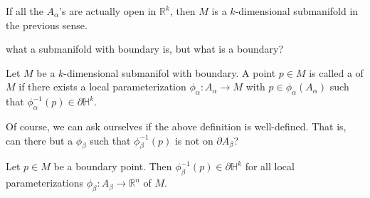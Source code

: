 \documentclass[notoc,notitlepage]{tufte-book}
\begin{document}
\begin{remark}
  If all the $A_\alpha$'s are actually open in $\mathbb{R}^k$, then $M$ is a
  $k$-dimensional submanifold in the previous sense.
\end{remark}

 what a submanifold with boundary is, but what is a
boundary?

\begin{defn}\label{defn:boundary_point_on_a_submanifold}
  Let $M$ be a $k$-dimensional submanifol with boundary. A point $p \in M$ is
  called a  of $M$ if there exists a local
  parameterization $\phi_\alpha : A_\alpha \to M$ with $p \in
  \phi_\alpha(A_\alpha)$ such that $\phi_\alpha^{-1} (p) \in \partial
  \mathbb{H}^k$.
\end{defn}

Of course, we can ask ourselves if the above definition is well-defined. That
is, can there but a $\phi_\beta$ such that $\phi_\beta^{-1}(p)$ is not on
$\partial A_\beta$?

\begin{propo}\label{propo:well_definedness_of_the_boundary_of_a_manifold}
  Let $p \in M$ be a boundary point. Then $\phi_\beta^{-1}(p) \in \partial
  \mathbb{H}^k$ for all local parameterizations $\phi_\beta : A_\beta \to
  \mathbb{R}^n$ of  $M$.
\end{propo}
\end{document}
